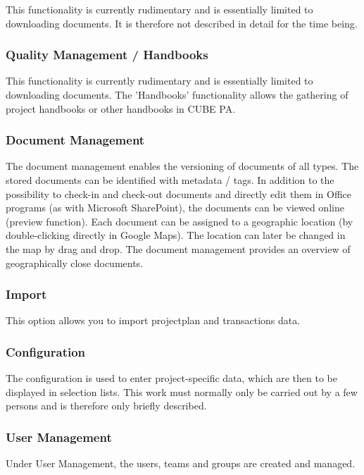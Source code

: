 This functionality is currently rudimentary and is essentially limited to downloading documents. It is therefore not described in detail for the time being.

\subsubsection{Quality Management / Handbooks} %

This functionality is currently rudimentary and is essentially limited to downloading documents. The 'Handbooks' functionality allows the gathering of project handbooks or other handbooks in CUBE PA.

\subsubsection{Document Management} %

The document management enables the versioning of documents of all types. The stored documents can be identified with metadata / tags. In addition to the possibility to check-in and check-out documents and directly edit them in Office programs (as with Microsoft SharePoint), the documents can be viewed online (preview function). Each document can be assigned to a geographic location (by double-clicking directly in Google Maps). The location can later be changed in the map by drag and drop. The document management provides an overview of geographically close documents.

\subsubsection{Import} %

This option allows you to import projectplan and transactions data.

\subsubsection{Configuration} %

The configuration is used to enter project-specific data, which are then to be displayed in selection lists. This work must normally only be carried out by a few persons and is therefore only briefly described.

\subsubsection{User Management} %

Under User Management, the users, teams and groups are created and managed.

